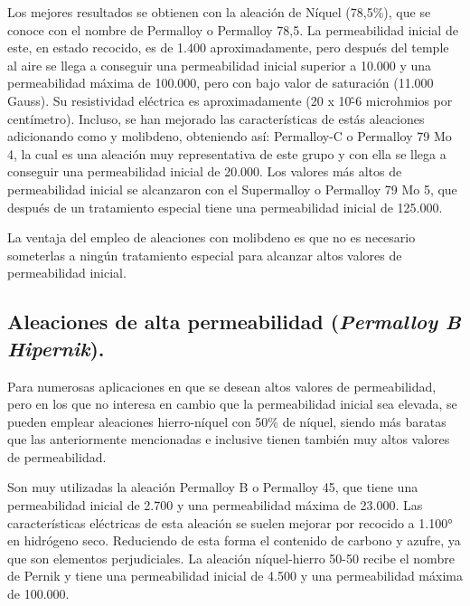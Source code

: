 \documentclass[12pt,a4paper]{article}
\begin{document}
Los mejores resultados se obtienen con la aleación de Níquel (78,5\%), que se conoce con el nombre de Permalloy o Permalloy 78,5. La permeabilidad inicial de este, en estado recocido, es de 1.400 aproximadamente, pero después del temple al aire se llega a conseguir una permeabilidad inicial superior a 10.000 y una permeabilidad máxima de 100.000, pero con bajo valor de saturación (11.000 Gauss). Su resistividad eléctrica es aproximadamente (20 x 10\^-6 microhmios por centímetro). Incluso, se han mejorado las características de estás aleaciones adicionando como y molibdeno, obteniendo así: Permalloy-C o Permalloy 79 Mo 4, la cual es una aleación muy representativa de este grupo y con ella se llega a conseguir una permeabilidad inicial de 20.000. Los valores más altos de permeabilidad inicial se alcanzaron con el Supermalloy o Permalloy 79 Mo 5, que después de un tratamiento especial tiene una permeabilidad inicial de 125.000.

La ventaja del empleo de aleaciones con molibdeno es que no es necesario someterlas a ningún tratamiento especial para alcanzar altos valores de permeabilidad inicial.

\subsection{Aleaciones de alta permeabilidad (\textit{Permalloy B Hipernik}).}

Para numerosas aplicaciones en que se desean altos valores de permeabilidad, pero en los que no interesa en cambio que la permeabilidad inicial sea elevada, se pueden emplear aleaciones hierro-níquel con 50\% de níquel, siendo más baratas que las anteriormente mencionadas e inclusive tienen también muy altos valores de permeabilidad.

Son muy utilizadas la aleación Permalloy B o Permalloy 45, que tiene una permeabilidad inicial de 2.700 y una permeabilidad máxima de 23.000. Las características eléctricas de esta aleación se suelen mejorar por recocido a 1.100° en hidrógeno seco. Reduciendo de esta forma el contenido de carbono y azufre, ya que son elementos perjudiciales. La aleación níquel-hierro 50-50 recibe el nombre de Pernik y tiene una permeabilidad inicial de 4.500 y una permeabilidad máxima de 100.000.
\end{document}
